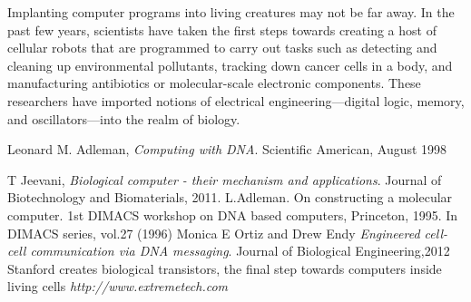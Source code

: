 \documentclass[a4paper]{article}
\begin{document}
Implanting computer programs into living creatures may not be far away. In the past few years, scientists have taken the first steps towards creating a host of cellular robots that are programmed to carry out tasks such as detecting and cleaning up environmental pollutants, tracking down cancer cells in a body, and manufacturing antibiotics or molecular-scale electronic components. These researchers have imported notions of electrical engineering—digital logic, memory, and oscillators—into the realm of biology.
\begin{thebibliography}{9}
  Leonard  M.  Adleman, 
  \emph{Computing  with  DNA}.
    Scientific  American, August 1998
  
  T Jeevani, 
  \emph{Biological computer - their mechanism and applications}.
  Journal of Biotechnology and Biomaterials, 2011.
  L.Adleman.  On  constructing  a  molecular  computer.  1st  DIMACS  workshop  on  DNA  based  computers,  Princeton,  1995.  In  DIMACS series, vol.27 (1996)
  Monica E Ortiz and Drew Endy
  \emph{Engineered cell-cell communication via DNA messaging}.
  Journal of Biological Engineering,2012
Stanford creates biological transistors, the final step towards computers inside living cells
  \emph{http://www.extremetech.com}
\end{thebibliography}
\end{document}
